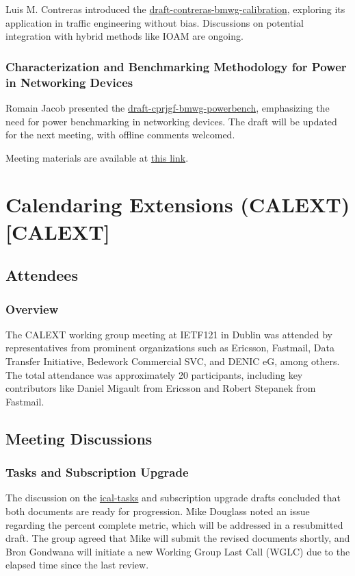 \documentclass{article}
\begin{document}
Luis M. Contreras introduced the \href{https://datatracker.ietf.org/doc/html/draft-contreras-bmwg-calibration}{draft-contreras-bmwg-calibration}, exploring its application in traffic engineering without bias. Discussions on potential integration with hybrid methods like IOAM are ongoing.

\subsubsection{Characterization and Benchmarking Methodology for Power in Networking Devices}

Romain Jacob presented the \href{https://datatracker.ietf.org/doc/html/draft-cprjgf-bmwg-powerbench}{draft-cprjgf-bmwg-powerbench}, emphasizing the need for power benchmarking in networking devices. The draft will be updated for the next meeting, with offline comments welcomed.

Meeting materials are available at \href{https://datatracker.ietf.org/meeting/121/materials/slides-121-bmwg-ietf-121-bmwg-chairs-slides-00}{this link}.



\newpage

\section{Calendaring Extensions (CALEXT) [CALEXT]}

\subsection{Attendees}

\subsubsection{Overview}
The CALEXT working group meeting at IETF121 in Dublin was attended by representatives from prominent organizations such as Ericsson, Fastmail, Data Transfer Initiative, Bedework Commercial SVC, and DENIC eG, among others. The total attendance was approximately 20 participants, including key contributors like Daniel Migault from Ericsson and Robert Stepanek from Fastmail.

\subsection{Meeting Discussions}

\subsubsection{Tasks and Subscription Upgrade}
The discussion on the \href{https://datatracker.ietf.org/doc/html/draft-ietf-calext-ical-tasks}{ical-tasks} and subscription upgrade drafts concluded that both documents are ready for progression. Mike Douglass noted an issue regarding the percent complete metric, which will be addressed in a resubmitted draft. The group agreed that Mike will submit the revised documents shortly, and Bron Gondwana will initiate a new Working Group Last Call (WGLC) due to the elapsed time since the last review.
\end{document}
